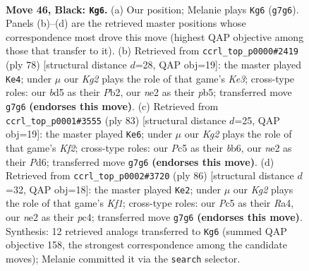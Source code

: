 \documentclass[11pt]{article}
\begin{document}
\clearpage

\begin{figure}[p]\centering
\begin{subfigure}{0.46\textwidth}\centering
\resizebox{\linewidth}{!}{%
\newchessgame
\chessboard[
  setfen={8/p3r1k1/r2p4/2pB4/2P3P1/7K/4NR2/8 b - - 5 46},
  showmover=false,
  pgfstyle=straightmove, color=movearrow, markmove={g7-g6}
]}
\caption{}
\end{subfigure}\hfill
\begin{subfigure}{0.46\textwidth}\centering
\resizebox{\linewidth}{!}{%
\newchessgame
\chessboard[
  setfen={8/8/4pk1p/1p1r4/5P2/PR2K2P/1P6/8 w - - 7 40},
  showmover=false,
  pgfstyle=straightmove, color=movearrow, markmove={e3-e4}
]}
\caption{}
\end{subfigure}
\\[4pt]
\begin{subfigure}{0.46\textwidth}\centering
\resizebox{\linewidth}{!}{%
\newchessgame
\chessboard[
  setfen={8/1p1r1k2/pB1p1p2/5N2/4r3/8/PP6/1K3R2 b - - 4 42},
  showmover=false,
  pgfstyle=straightmove, color=movearrow, markmove={f7-e6}
]}
\caption{}
\end{subfigure}\hfill
\begin{subfigure}{0.46\textwidth}\centering
\resizebox{\linewidth}{!}{%
\newchessgame
\chessboard[
  setfen={1r6/8/8/3kp3/RPp4r/P7/2R2P2/5K2 w - - 1 44},
  showmover=false,
  pgfstyle=straightmove, color=movearrow, markmove={f1-e2}
]}
\caption{}
\end{subfigure}
\caption{\textbf{Move 46, Black: \texttt{Kg6}.} (a) Our position; Melanie plays \texttt{Kg6} (\texttt{g7g6}). Panels (b)--(d) are the retrieved master positions whose correspondence most drove this move (highest QAP objective among those that transfer to it). (b) Retrieved from \texttt{ccrl\_top\_p0000\#2419} (ply 78) [structural distance $d$=28, QAP obj=19]: the master played \texttt{Ke4}; under $\mu$ our \emph{Kg2} plays the role of that game's \emph{Ke3}; cross-type roles: our \emph{b}d5 as their \emph{P}b2, our \emph{n}e2 as their \emph{p}b5; transferred move \texttt{g7g6} \textbf{(endorses this move)}. (c) Retrieved from \texttt{ccrl\_top\_p0001\#3555} (ply 83) [structural distance $d$=25, QAP obj=19]: the master played \texttt{Ke6}; under $\mu$ our \emph{Kg2} plays the role of that game's \emph{Kf2}; cross-type roles: our \emph{P}c5 as their \emph{b}b6, our \emph{n}e2 as their \emph{P}d6; transferred move \texttt{g7g6} \textbf{(endorses this move)}. (d) Retrieved from \texttt{ccrl\_top\_p0002\#3720} (ply 86) [structural distance $d$=32, QAP obj=18]: the master played \texttt{Ke2}; under $\mu$ our \emph{Kg2} plays the role of that game's \emph{Kf1}; cross-type roles: our \emph{P}c5 as their \emph{R}a4, our \emph{n}e2 as their \emph{p}c4; transferred move \texttt{g7g6} \textbf{(endorses this move)}. Synthesis: 12 retrieved analogs transferred to \texttt{Kg6} (summed QAP objective 158, the strongest correspondence among the candidate moves); Melanie committed it via the \texttt{search} selector.}
\label{fig:thought-m91}
\end{figure}
\end{document}
